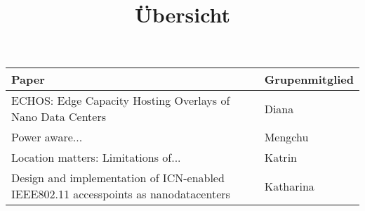 \documentclass[11pt, twoside, BCOR=8mm, DIV=12]{scrartcl}
\title{Übersicht}
\begin{document}
\maketitle

\begin{tabular}{l | l}
Paper & Grupenmitglied \\
\hline
ECHOS: Edge Capacity Hosting Overlays of Nano Data Centers & Diana \\
Power aware... & Mengchu \\
Location matters: Limitations of... & Katrin \\
Design and implementation of ICN-enabled IEEE802.11 accesspoints
as nanodatacenters & Katharina \\
\end{tabular}
\end{document}
